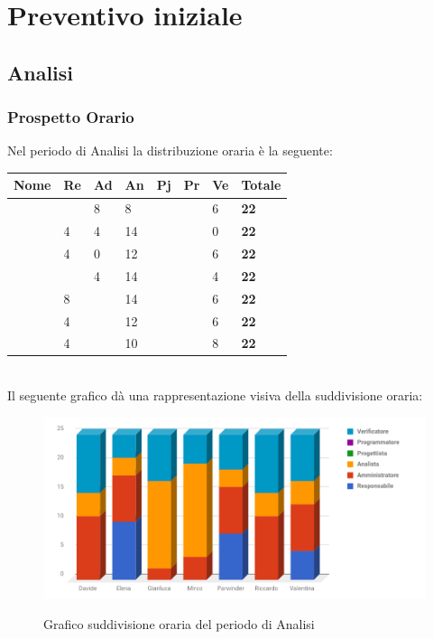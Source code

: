 \documentclass[PianoDiProgetto.tex]{subfiles}
\begin{document}
\chapter{Preventivo iniziale}

\section{Analisi}

\subsection{Prospetto Orario}
Nel periodo di Analisi la distribuzione oraria è la seguente:
\begin{table}[htbp]
	\centering
	\renewcommand\arraystretch{1.5}
	\begin{tabularx}{\textwidth}{p{4cm}|p{1cm}|p{1cm}|p{1cm}|p{1cm}|p{1cm}|p{1cm}|p{2cm}}
		\hline
		\textbf{Nome} & \textbf{Re} & \textbf{Ad} & \textbf{An} & \textbf{Pj} & \textbf{Pr} & \textbf{Ve} & \textbf{Totale} \\
		\hline
		\Davide & \ & 8 & 8 & \ & \ & 6 & \textbf{22} \\
		\hline
		\Elena & 4 & 4 & 14 & \ & \ & 0 & \textbf{22} \\
		\hline
		\Gianluca & 4 & 0 & 12 & \ & \ & 6 & \textbf{22} \\
		\hline
		\Mirco & \ & 4 & 14 & \ & \ & 4 & \textbf{22} \\
		\hline
		\Parwinder & 8 & \ & 14 & \ & \ & 6 & \textbf{22} \\
		\hline
		\Riccardo & 4 & \ & 12 & \ & \ & 6 & \textbf{22} \\
		\hline
		\Valentina & 4 & \ & 10 & \ & \ & 8 & \textbf{22} \\
		\hline
	\end{tabularx}
\end{table} \\
Il seguente grafico dà una rappresentazione visiva della suddivisione oraria:
\begin{figure}
	\includegraphics[width=14.5cm]{images/prospettoOrario/analisi.png}
	\label{fig:foo}
	\caption{Grafico suddivisione oraria del periodo di Analisi}
\end{figure} 
\newpage
\end{document}
